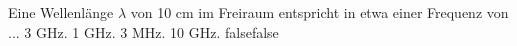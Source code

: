     {Eine Wellenlänge $\lambda$ von 10 cm im Freiraum entspricht in etwa einer Frequenz von ...}
    {3 GHz.}
    {1 GHz.}
    {3 MHz.}
    {10 GHz.}
    {false}{false}